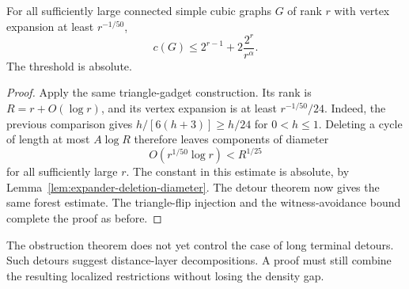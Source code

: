 \begin{corollary}
\label{cor:weak-expander-polynomial-cycles}
For all sufficiently large connected simple cubic graphs $G$ of rank $r$ with vertex expansion at least $r^{-1/50}$,
\[
 c(G)\le2^{r-1}+2\frac{2^r}{r^\alpha}.
\]
The threshold is absolute.
\end{corollary}

\begin{proof}
Apply the same triangle-gadget construction.
Its rank is $R=r+O(\log r)$, and its vertex expansion is at least $r^{-1/50}/24$.
Indeed, the previous comparison gives $h/[6(h+3)]\ge h/24$ for $0<h\le1$.
Deleting a cycle of length at most $A\log R$ therefore leaves components of diameter
\[
 O(r^{1/50}\log r)<R^{1/25}
\]
for all sufficiently large $r$.
The constant in this estimate is absolute, by Lemma~\ref{lem:expander-deletion-diameter}.
The detour theorem now gives the same forest estimate.
The triangle-flip injection and the witness-avoidance bound complete the proof as before.
\end{proof}

The obstruction theorem does not yet control the case of long terminal detours.
Such detours suggest distance-layer decompositions.
A proof must still combine the resulting localized restrictions without losing the density gap.
